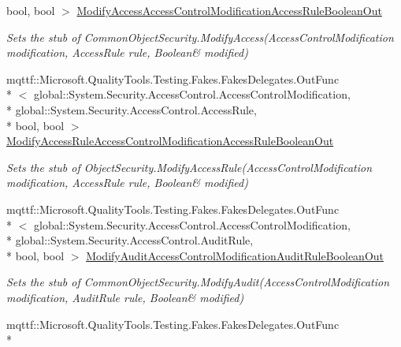 \begin{DoxyCompactItemize}
bool, bool $>$ \hyperlink{class_system_1_1_security_1_1_access_control_1_1_fakes_1_1_stub_native_object_security_a123d5770cf40c5cd5f4e7775c196c6e7}{Modify\-Access\-Access\-Control\-Modification\-Access\-Rule\-Boolean\-Out}
\begin{DoxyCompactList}\small\item\em Sets the stub of Common\-Object\-Security.\-Modify\-Access(Access\-Control\-Modification modification, Access\-Rule rule, Boolean\& modified)\end{DoxyCompactList}\item 
mqttf\-::\-Microsoft.\-Quality\-Tools.\-Testing.\-Fakes.\-Fakes\-Delegates.\-Out\-Func\\*
$<$ global\-::\-System.\-Security.\-Access\-Control.\-Access\-Control\-Modification, \\*
global\-::\-System.\-Security.\-Access\-Control.\-Access\-Rule, \\*
bool, bool $>$ \hyperlink{class_system_1_1_security_1_1_access_control_1_1_fakes_1_1_stub_native_object_security_a670b92f190de7dec3fc039b300dd4690}{Modify\-Access\-Rule\-Access\-Control\-Modification\-Access\-Rule\-Boolean\-Out}
\begin{DoxyCompactList}\small\item\em Sets the stub of Object\-Security.\-Modify\-Access\-Rule(Access\-Control\-Modification modification, Access\-Rule rule, Boolean\& modified)\end{DoxyCompactList}\item 
mqttf\-::\-Microsoft.\-Quality\-Tools.\-Testing.\-Fakes.\-Fakes\-Delegates.\-Out\-Func\\*
$<$ global\-::\-System.\-Security.\-Access\-Control.\-Access\-Control\-Modification, \\*
global\-::\-System.\-Security.\-Access\-Control.\-Audit\-Rule, \\*
bool, bool $>$ \hyperlink{class_system_1_1_security_1_1_access_control_1_1_fakes_1_1_stub_native_object_security_acbe061142c8700734e8c7f5e7cd0ca27}{Modify\-Audit\-Access\-Control\-Modification\-Audit\-Rule\-Boolean\-Out}
\begin{DoxyCompactList}\small\item\em Sets the stub of Common\-Object\-Security.\-Modify\-Audit(Access\-Control\-Modification modification, Audit\-Rule rule, Boolean\& modified)\end{DoxyCompactList}\item 
mqttf\-::\-Microsoft.\-Quality\-Tools.\-Testing.\-Fakes.\-Fakes\-Delegates.\-Out\-Func\\*

\end{DoxyCompactItemize}
